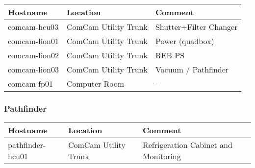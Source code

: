 \begin{tabular}{|p{5cm}|p{3cm}|p{5cm}| }
    \hline
    \rowcolor{lightgray}
    Hostname & Location & Comment \\
    \hline
    comcam-hcu03 & ComCam Utility Trunk & Shutter+Filter Changer \\
    \hline
    comcam-lion01 & ComCam Utility Trunk & Power (quadbox) \\
    \hline
    comcam-lion02 & ComCam Utility Trunk & REB PS \\
    \hline
    comcam-lion03 & ComCam Utility Trunk & Vacuum / Pathfinder \\
    \hline
    comcam-fp01 & Computer Room & - \\
    \hline
\end{tabular}

\subsubsection{Pathfinder}

\begin{tabular}{|p{5cm}|p{3cm}|p{5cm}| }
    \hline
    \rowcolor{lightgray}
    Hostname & Location & Comment \\
    \hline
    pathfinder-hcu01 & ComCam Utility Trunk & Refrigeration Cabinet and Monitoring \\
    \hline
\end{tabular}

